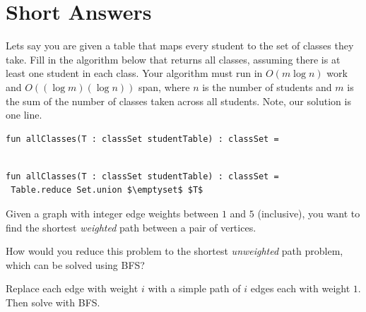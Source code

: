 \section{Short Answers}

%

\begin{problem}[20.][Classes]

Lets say you are given a table that maps every student to the set of
classes they take.  
Fill in the algorithm below that returns all classes,
assuming there is at least one student in each class.  Your algorithm
must run in $O(m \log n)$ work and $O((\log m)(\log n))$ span, where
$n$ is the number of students and $m$ is the sum of the number of
classes taken across all students.    Note, our solution is one line.

\ask

\begin{lstlisting}[numbers=none]
fun allClasses(T : classSet studentTable) : classSet = 


\end{lstlisting}


\sol
\begin{lstlisting}[numbers=none]
fun allClasses(T : classSet studentTable) : classSet = 
 Table.reduce Set.union $\emptyset$ $T$
\end{lstlisting}

\end{problem}

%

\begin{problem}

Given a graph with integer edge weights between $1$ and $5$
(inclusive), you want to find the shortest \emph{weighted} path
between a pair of vertices. 

\ask
How would you reduce this problem to the
shortest \emph{unweighted} path problem, which can be solved using
BFS?

\sol
Replace each edge with weight $i$ with a simple path of $i$ edges
each with weight $1$. Then solve with BFS.

\end{problem}


